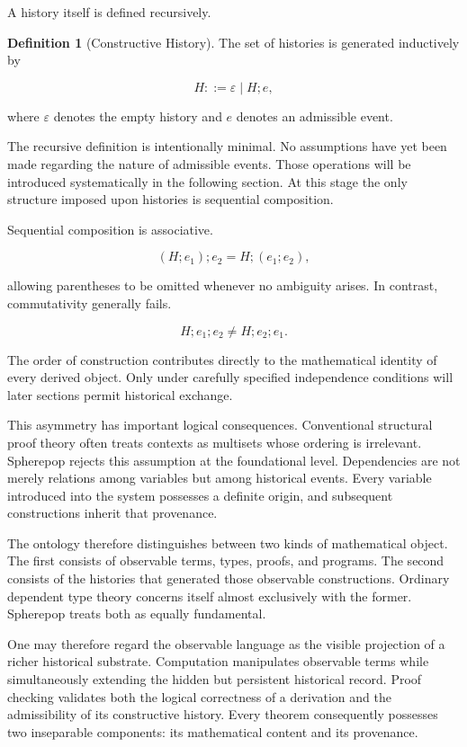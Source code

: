 \documentclass[12pt,oneside]{article}
\theoremstyle{definition}
\newtheorem{definition}[theorem]{Definition}
\theoremstyle{remark}
\begin{document}
A history itself is defined recursively.

\begin{definition}[Constructive History]

The set of histories is generated inductively by

\[
H
::=
\varepsilon
\mid
H;e,
\]

where $\varepsilon$ denotes the empty history and $e$ denotes an admissible event.

\end{definition}

The recursive definition is intentionally minimal. No assumptions have yet been made regarding the nature of admissible events. Those operations will be introduced systematically in the following section. At this stage the only structure imposed upon histories is sequential composition.

Sequential composition is associative.

\[
(H;e_1);e_2
=
H;(e_1;e_2),
\]

allowing parentheses to be omitted whenever no ambiguity arises. In contrast, commutativity generally fails.

\[
H;e_1;e_2
\neq
H;e_2;e_1.
\]

The order of construction contributes directly to the mathematical identity of every derived object. Only under carefully specified independence conditions will later sections permit historical exchange.

This asymmetry has important logical consequences. Conventional structural proof theory often treats contexts as multisets whose ordering is irrelevant. Spherepop rejects this assumption at the foundational level. Dependencies are not merely relations among variables but among historical events. Every variable introduced into the system possesses a definite origin, and subsequent constructions inherit that provenance.

The ontology therefore distinguishes between two kinds of mathematical object. The first consists of observable terms, types, proofs, and programs. The second consists of the histories that generated those observable constructions. Ordinary dependent type theory concerns itself almost exclusively with the former. Spherepop treats both as equally fundamental.

One may therefore regard the observable language as the visible projection of a richer historical substrate. Computation manipulates observable terms while simultaneously extending the hidden but persistent historical record. Proof checking validates both the logical correctness of a derivation and the admissibility of its constructive history. Every theorem consequently possesses two inseparable components: its mathematical content and its provenance.
\end{document}
